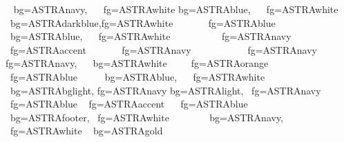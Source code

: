    {bg=ASTRAnavy,    fg=ASTRAwhite}
 {bg=ASTRAblue,    fg=ASTRAwhite}
  {bg=ASTRAdarkblue,fg=ASTRAwhite}
         {fg=ASTRAblue}
        {bg=ASTRAblue,    fg=ASTRAwhite}
             {fg=ASTRAnavy}
            {fg=ASTRAaccent}
         {fg=ASTRAnavy}
              {fg=ASTRAnavy}
       {fg=ASTRAnavy,    bg=ASTRAwhite}
      {fg=ASTRAorange}
      {fg=ASTRAblue}
       {bg=ASTRAblue,    fg=ASTRAwhite}
        {bg=ASTRAbglight, fg=ASTRAnavy}
 {bg=ASTRAlight,  fg=ASTRAnavy}
      {fg=ASTRAblue}
   {fg=ASTRAaccent}
    {fg=ASTRAblue}
          {bg=ASTRAfooter,  fg=ASTRAwhite}
          {bg=ASTRAnavy,    fg=ASTRAwhite}
   {bg=ASTRAgold}




